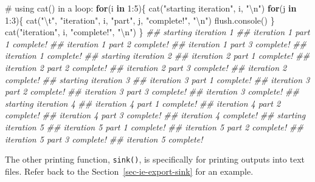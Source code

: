 \documentclass[
  13,
  letterpaper,
]{report}
\newenvironment{Shaded}{\begin{snugshade}}{\end{snugshade}}
\newcommand{\CommentTok}[1]{\textcolor[rgb]{0.37,0.37,0.37}{#1}}
\newcommand{\ControlFlowTok}[1]{\textcolor[rgb]{0.00,0.23,0.31}{\textbf{#1}}}
\newcommand{\DecValTok}[1]{\textcolor[rgb]{0.68,0.00,0.00}{#1}}
\newcommand{\DocumentationTok}[1]{\textcolor[rgb]{0.37,0.37,0.37}{\textit{#1}}}
\newcommand{\FunctionTok}[1]{\textcolor[rgb]{0.28,0.35,0.67}{#1}}
\newcommand{\NormalTok}[1]{\textcolor[rgb]{0.00,0.23,0.31}{#1}}
\newcommand{\SpecialCharTok}[1]{\textcolor[rgb]{0.37,0.37,0.37}{#1}}
\newcommand{\StringTok}[1]{\textcolor[rgb]{0.13,0.47,0.30}{#1}}
\begin{document}
\begin{Shaded}
\begin{Highlighting}[]
\CommentTok{\# using cat() in a loop:}
\ControlFlowTok{for}\NormalTok{(i }\ControlFlowTok{in} \DecValTok{1}\SpecialCharTok{:}\DecValTok{5}\NormalTok{)\{}
    \FunctionTok{cat}\NormalTok{(}\StringTok{"starting iteration"}\NormalTok{, i, }\StringTok{"}\SpecialCharTok{\textbackslash{}n}\StringTok{"}\NormalTok{)}
    \ControlFlowTok{for}\NormalTok{(j }\ControlFlowTok{in} \DecValTok{1}\SpecialCharTok{:}\DecValTok{3}\NormalTok{)\{}
        \FunctionTok{cat}\NormalTok{(}\StringTok{"}\SpecialCharTok{\textbackslash{}t}\StringTok{"}\NormalTok{, }\StringTok{"iteration"}\NormalTok{, i, }\StringTok{"part"}\NormalTok{, j, }\StringTok{"complete!"}\NormalTok{, }\StringTok{"}\SpecialCharTok{\textbackslash{}n}\StringTok{"}\NormalTok{)}
        \FunctionTok{flush.console}\NormalTok{()}
\NormalTok{    \}}
    \FunctionTok{cat}\NormalTok{(}\StringTok{"iteration"}\NormalTok{, i, }\StringTok{"complete!"}\NormalTok{, }\StringTok{"}\SpecialCharTok{\textbackslash{}n}\StringTok{"}\NormalTok{)}
\NormalTok{\}}
\DocumentationTok{\#\# starting iteration 1 }
\DocumentationTok{\#\#   iteration 1 part 1 complete! }
\DocumentationTok{\#\#   iteration 1 part 2 complete! }
\DocumentationTok{\#\#   iteration 1 part 3 complete! }
\DocumentationTok{\#\# iteration 1 complete! }
\DocumentationTok{\#\# starting iteration 2 }
\DocumentationTok{\#\#   iteration 2 part 1 complete! }
\DocumentationTok{\#\#   iteration 2 part 2 complete! }
\DocumentationTok{\#\#   iteration 2 part 3 complete! }
\DocumentationTok{\#\# iteration 2 complete! }
\DocumentationTok{\#\# starting iteration 3 }
\DocumentationTok{\#\#   iteration 3 part 1 complete! }
\DocumentationTok{\#\#   iteration 3 part 2 complete! }
\DocumentationTok{\#\#   iteration 3 part 3 complete! }
\DocumentationTok{\#\# iteration 3 complete! }
\DocumentationTok{\#\# starting iteration 4 }
\DocumentationTok{\#\#   iteration 4 part 1 complete! }
\DocumentationTok{\#\#   iteration 4 part 2 complete! }
\DocumentationTok{\#\#   iteration 4 part 3 complete! }
\DocumentationTok{\#\# iteration 4 complete! }
\DocumentationTok{\#\# starting iteration 5 }
\DocumentationTok{\#\#   iteration 5 part 1 complete! }
\DocumentationTok{\#\#   iteration 5 part 2 complete! }
\DocumentationTok{\#\#   iteration 5 part 3 complete! }
\DocumentationTok{\#\# iteration 5 complete!}
\end{Highlighting}
\end{Shaded}

The other printing function, \texttt{sink()}, is specifically for
printing outputs into text files. Refer back to the
Section~\ref{sec-ie-export-sink} for an example.
\end{document}
